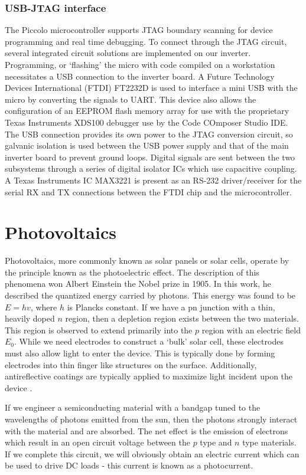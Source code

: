 \subsubsection{USB-JTAG interface}
The Piccolo microcontroller supports JTAG boundary scanning for device programming and real time debugging. To connect through the JTAG circuit, several integrated circuit solutions are implemented on our inverter. Programming, or 
`flashing' the micro with code compiled on a workstation necessitates a USB connection to the inverter board. A Future Technology Devices International (FTDI) FT2232D is used to interface a mini USB with the micro by converting the signals to UART. This device also allows the configuration of an EEPROM flash memory array for use with the proprietary Texas Instruments XDS100 debugger use by the Code COmposer Studio IDE. The USB connection provides its own power to the JTAG conversion circuit, so galvanic isolation is used between the USB power supply and that of the main inverter board to prevent ground loops. Digital signals are sent between the two subsystems through a series of digital isolator ICs which use capacitive coupling. A Texas Instruments IC MAX3221 is present as an RS-232 driver/receiver for the serial RX and TX connections between the FTDI chip and the microcontroller.

\section{Photovoltaics}
Photovoltaics, more commonly known as solar panels or solar cells, operate by the principle known as the photoelectric effect. The description of this phenomena won Albert Einstein the Nobel prize in 1905. In this work, he described the quantized energy carried by photons. This energy was found to be $E=hv$, where $h$ is Plancks constant. If we have a pn junction with a thin, heavily doped $n$ region, then a depletion region exists between the two materials. This region is observed to extend primarily into the $p$ region with an electric field $E_0$. While we need electrodes to construct a `bulk' solar cell, these electrodes must also allow light to enter the device. This is typically done by forming electrodes into thin finger like structures on the surface. Additionally, antireflective coatings are typically applied to maximize light incident upon the device \cite{materials}.

If we engineer a semiconducting material with a bandgap tuned to the wavelengths of photons emitted from the sun, then the photons strongly interact with the material and are absorbed. The net effect is the emission of electrons which result in an open circuit voltage between the $p$ type and $n$ type materials. If we complete this circuit, we will obviously obtain an electric current which can be used to drive DC loads - this current is known as a photocurrent. 


